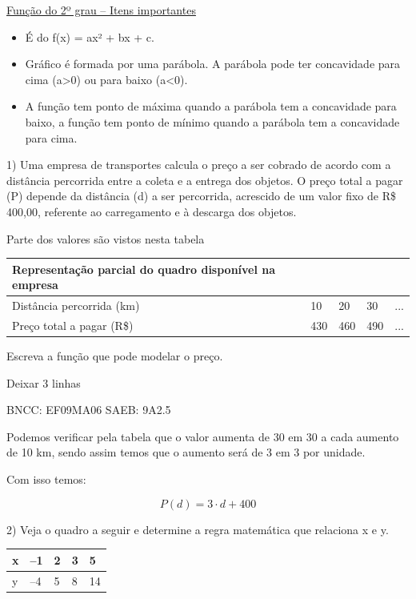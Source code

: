 \begin{escolha}
{{{\begin{escolha}
{\ul{Função do 2º grau -- Itens importantes}

\begin{itemize}
\item
  É do f(x) = ax² + bx + c.
\item
  Gráfico é formada por uma parábola. A parábola pode ter concavidade
  para cima (a\textgreater0) ou para baixo (a\textless0).
\item
  A função tem ponto de máxima quando a parábola tem a concavidade para
  baixo, a função tem ponto de mínimo quando a parábola tem a
  concavidade para cima.
\end{itemize}


1) Uma empresa de transportes calcula o preço a ser cobrado de acordo
com a distância percorrida entre a coleta e a entrega dos objetos. O
preço total a pagar (P) depende da distância (d) a ser percorrida,
acrescido de um valor fixo de R\$ 400,00, referente ao carregamento e à
descarga dos objetos.

Parte dos valores são vistos nesta tabela

\begin{longtable}[]{@{}lllll@{}}
\toprule\noalign{}
\textbf{Representação parcial do quadro disponível na empresa} & & &
& \\
\midrule\noalign{}
\endhead
\bottomrule\noalign{}
\endlastfoot
Distância percorrida (km) & 10 & 20 & 30 & ... \\
Preço total a pagar (R\$) & 430 & 460 & 490 & ... \\
\end{longtable}

Escreva a função que pode modelar o preço.

Deixar 3 linhas

BNCC: EF09MA06 SAEB: 9A2.5

Podemos verificar pela tabela que o valor aumenta de 30 em 30 a cada
aumento de 10 km, sendo assim temos que o aumento será de 3 em 3 por
unidade.

Com isso temos:

\[P\left( d \right) = 3 \cdot d + 400\]

2) Veja o quadro a seguir e determine a regra matemática que relaciona x
e y.

\begin{longtable}[]{@{}lllll@{}}
\toprule\noalign{}
x & --1 & 2 & 3 & 5 \\
\midrule\noalign{}
\endhead
\bottomrule\noalign{}
\endlastfoot
y & --4 & 5 & 8 & 14 \\
\end{longtable}

}
\end{escolha}}}}
\end{escolha}
